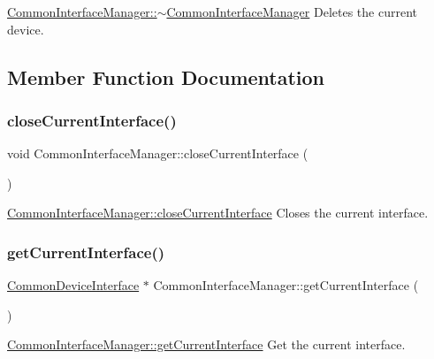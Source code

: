 \hyperlink{class_common_interface_manager_ad92cabe2e4f39fd762cf621df5125fa1}{Common\+Interface\+Manager\+::$\sim$\+Common\+Interface\+Manager} Deletes the current device. 



\subsection{Member Function Documentation}
\hypertarget{class_common_interface_manager_a16ab6917c45e1b40efe61d5379206ceb}{}\label{class_common_interface_manager_a16ab6917c45e1b40efe61d5379206ceb} 
\subsubsection{\texorpdfstring{close\+Current\+Interface()}{closeCurrentInterface()}}
{\footnotesize\ttfamily void Common\+Interface\+Manager\+::close\+Current\+Interface (\begin{DoxyParamCaption}{ }\end{DoxyParamCaption})}



\hyperlink{class_common_interface_manager_a16ab6917c45e1b40efe61d5379206ceb}{Common\+Interface\+Manager\+::close\+Current\+Interface} Closes the current interface. 

\hypertarget{class_common_interface_manager_a24a72b0f78f9e6037e2da899e8170b2f}{}\label{class_common_interface_manager_a24a72b0f78f9e6037e2da899e8170b2f} 
\subsubsection{\texorpdfstring{get\+Current\+Interface()}{getCurrentInterface()}}
{\footnotesize\ttfamily \hyperlink{class_common_device_interface}{Common\+Device\+Interface} $\ast$ Common\+Interface\+Manager\+::get\+Current\+Interface (\begin{DoxyParamCaption}{ }\end{DoxyParamCaption})}



\hyperlink{class_common_interface_manager_a24a72b0f78f9e6037e2da899e8170b2f}{Common\+Interface\+Manager\+::get\+Current\+Interface} Get the current interface. 


